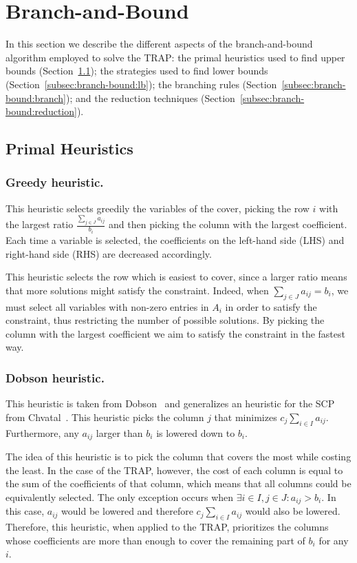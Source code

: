 \documentclass[runningheads]{llncs}
\begin{document}
\section{Branch-and-Bound}
\label{sec:branch-bound}

In this section we describe the different aspects of the branch-and-bound algorithm employed to solve the TRAP: the primal heuristics used to find upper bounds (Section~\ref{subsec:branch-bound:primal}); the strategies used to find lower bounds (Section~\ref{subsec:branch-bound:lb}); the branching rules (Section~\ref{subsec:branch-bound:branch}); and the reduction techniques (Section~\ref{subsec:branch-bound:reduction}). 

\subsection{Primal Heuristics}
\label{subsec:branch-bound:primal}

\subsubsection{Greedy heuristic.} This heuristic selects greedily the variables of the cover, picking the row $i$ with the largest ratio $\frac{\sum_{j \in J} a_{ij}}{b_i}$ and then picking the column with the largest coefficient. Each time a variable is selected, the coefficients on the left-hand side (LHS) and right-hand side (RHS) are decreased accordingly.

This heuristic selects the row which is easiest to cover, since a larger ratio means that more solutions might satisfy the constraint. Indeed, when $\sum_{j \in J} a_{ij} = b_i$, we must select all variables with non-zero entries in $A_i$ in order to satisfy the constraint, thus restricting the number of possible solutions. By picking the column with the largest coefficient we aim to satisfy the constraint in the fastest way.

\subsubsection{Dobson heuristic.} This heuristic is taken from Dobson~\cite{dobson-1982-worst-case} and generalizes an heuristic for the SCP from Chvatal~\cite{chvatal-1979-greedy}. This heuristic picks the column $j$ that minimizes $c_j \sum_{i \in I} a_{ij}$. Furthermore, any $a_{ij}$ larger than $b_i$ is lowered down to $b_i$.

The idea of this heuristic is to pick the column that covers the most while costing the least. In the case of the TRAP, however, the cost of each column is equal to the sum of the coefficients of that column, which means that all columns could be equivalently selected. The only exception occurs when $\exists i \in I, j \in J : a_{ij} > b_i$. In this case, $a_{ij}$ would be lowered and therefore $c_j \sum_{i \in I} a_{ij}$ would also be lowered. Therefore, this heuristic, when applied to the TRAP, prioritizes the columns whose coefficients are more than enough to cover the remaining part of $b_i$ for any $i$. 
\end{document}
